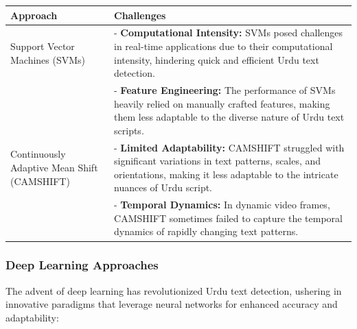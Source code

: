 \documentclass[default,iicol]{sn-jnl}%
\begin{document}
	\begin{table}[ht]
		\centering
		\begin{tabular}{|p{3cm}|p{6cm}|}
			\hline
			\textbf{Approach} & \textbf{Challenges} \\
			\hline
			Support Vector Machines (SVMs) & 
			- \textbf{Computational Intensity:} SVMs posed challenges in real-time applications due to their computational intensity, hindering quick and efficient Urdu text detection. \\
			& - \textbf{Feature Engineering:} The performance of SVMs heavily relied on manually crafted features, making them less adaptable to the diverse nature of Urdu text scripts. \\
			\hline
			Continuously Adaptive Mean Shift (CAMSHIFT) & 
			- \textbf{Limited Adaptability:} CAMSHIFT struggled with significant variations in text patterns, scales, and orientations, making it less adaptable to the intricate nuances of Urdu script. \\
			& - \textbf{Temporal Dynamics:} In dynamic video frames, CAMSHIFT sometimes failed to capture the temporal dynamics of rapidly changing text patterns. \\
			\hline
		\end{tabular}
	\end{table}
	
	\subsubsection{Deep Learning Approaches}
	
	The advent of deep learning has revolutionized Urdu text detection, ushering in innovative paradigms that leverage neural networks for enhanced accuracy and adaptability:
	
\end{document}
